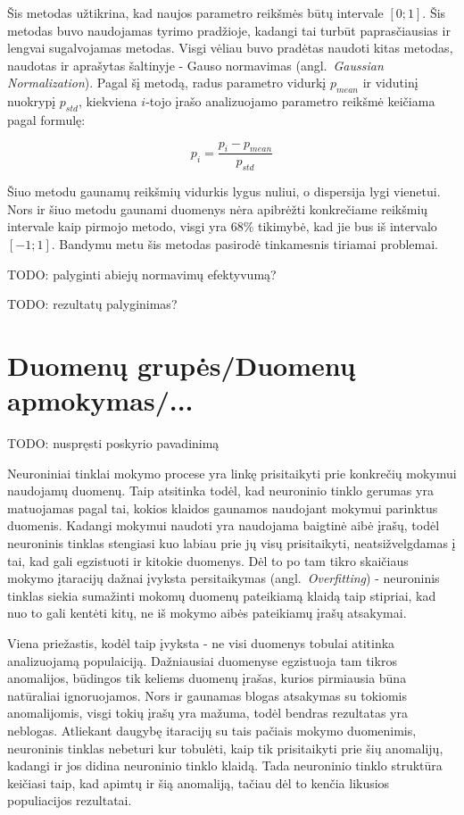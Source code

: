 \documentclass{VUMIFPSbakalaurinis}
\newcommand{\TODO}[1]{
\colorbox{todo-background-color}{TODO: #1}
}
\begin{document}
Šis metodas užtikrina, kad naujos parametro reikšmės būtų intervale $[0; 1]$.
Šis metodas buvo naudojamas tyrimo pradžioje, kadangi tai turbūt paprasčiausias ir lengvai sugalvojamas metodas.
Visgi vėliau buvo pradėtas naudoti kitas metodas, naudotas ir aprašytas \cite{gaussian} šaltinyje - Gauso normavimas (angl.~\textit{Gaussian Normalization}).
Pagal šį metodą, radus parametro vidurkį $p_{mean}$ ir vidutinį nuokrypį $p_{std}$, kiekviena $i$-tojo įrašo analizuojamo parametro reikšmė keičiama pagal formulę:

\begin{equation}
p_i = \frac{p_i - p_{mean}}{p_{std}}
\end{equation}

Šiuo metodu gaunamų reikšmių vidurkis lygus nuliui, o dispersija lygi vienetui.
Nors ir šiuo metodu gaunami duomenys nėra apibrėžti konkrečiame reikšmių intervale kaip pirmojo metodo, visgi yra 68\% tikimybė, kad jie bus iš intervalo $[-1; 1]$.
Bandymu metu šis metodas pasirodė tinkamesnis tiriamai problemai.

\TODO{palyginti abiejų normavimų efektyvumą?}

\TODO{rezultatų palyginimas?}

\section{Duomenų grupės/Duomenų apmokymas/...}

\TODO{nuspręsti poskyrio pavadinimą}

Neuroniniai tinklai mokymo procese yra linkę prisitaikyti prie konkrečių mokymui naudojamų duomenų.
Taip atsitinka todėl, kad neuroninio tinklo gerumas yra matuojamas pagal tai, kokios klaidos gaunamos naudojant mokymui parinktus duomenis.
Kadangi mokymui naudoti yra naudojama baigtinė aibė įrašų, todėl neuroninis tinklas stengiasi kuo labiau prie jų visų prisitaikyti, neatsižvelgdamas į tai, kad gali egzistuoti ir kitokie duomenys.
Dėl to po tam tikro skaičiaus mokymo įtaracijų dažnai įvyksta persitaikymas (angl.~\textit{Overfitting}) - neuroninis tinklas siekia sumažinti mokomų duomenų pateikiamą klaidą taip stipriai, kad nuo to gali kentėti kitų, ne iš mokymo aibės pateikiamų įrašų atsakymai.

Viena priežastis, kodėl taip įvyksta - ne visi duomenys tobulai atitinka analizuojamą populaiciją. Dažniausiai duomenyse egzistuoja tam tikros anomalijos, būdingos tik keliems duomenų įrašas, kurios pirmiausia būna natūraliai ignoruojamos.
Nors ir gaunamas blogas atsakymas su tokiomis anomalijomis, visgi tokių įrašų yra mažuma, todėl bendras rezultatas yra neblogas.
Atliekant daugybę itaracijų su tais pačiais mokymo duomenimis, neuroninis tinklas nebeturi kur tobulėti, kaip tik prisitaikyti prie šių anomalijų, kadangi ir jos didina neuroninio tinklo klaidą.
Tada neuroninio tinklo struktūra keičiasi taip, kad apimtų ir šią anomaliją, tačiau dėl to kenčia likusios populiacijos rezultatai.
\end{document}

